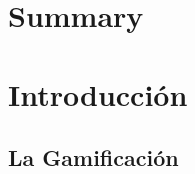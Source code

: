 \documentclass[a4paper, 12pt]{book}
\newif\iftocs
\begin{document}
\chapter*{Summary}

\cleardoublepage




\tableofcontents 


\cleardoublepage

\iftocs
\addcontentsline{toc}{chapter}{Lista de figuras.}%
\else
\fi

\listoffigures %



\cleardoublepage

\iftocs
\addcontentsline{toc}{chapter}{Lista de tablas}%
\else
\fi
\listoftables %

\iftocs
\addcontentsline{toc}{chapter}{Acrónimos}%
\else
\fi

 
\printglossary[title=Glosario,toctitle=Glosario]
\printglossary[title=Acrónimos,toctitle=Acrónimos,type=\acronymtype]



\cleardoublepage
{} %
\chapter{Introducción}


\section{La Gamificación}
\end{document}
